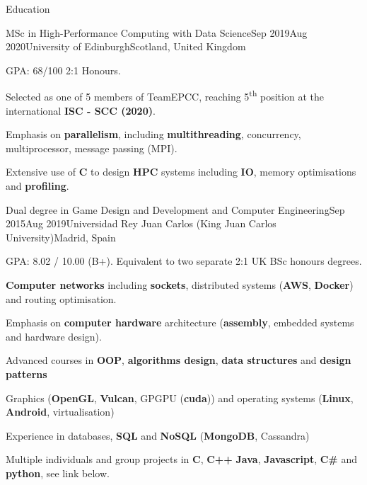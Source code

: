\documentclass{resume} %
\begin{document}
\begin{mainSection}{Education}
\begin{educationItem}
{MSc in High-Performance Computing with Data Science}{Sep 2019}{Aug 2020}{University of Edinburgh}{Scotland, United Kingdom}

\item GPA: 68/100 2:1 Honours.

\item Selected as one of 5 members of TeamEPCC, reaching 5\textsuperscript{th} position at the international \textbf{ISC - SCC (2020)}.%

\item Emphasis on \textbf{parallelism}, including \textbf{multithreading}, concurrency, multiprocessor, message passing (MPI).

\item Extensive use of \textbf{C} to design \textbf{HPC} systems including \textbf{IO}, memory optimisations and \textbf{profiling}.
\end{educationItem}
\begin{educationItem}
{Dual degree in Game Design and Development and Computer Engineering}{Sep 2015}{Aug 2019}{Universidad Rey Juan Carlos (King Juan Carlos University)}{Madrid, Spain}

\item GPA: 8.02 / 10.00 (B+). Equivalent to two separate 2:1 UK BSc honours degrees.

\item \textbf{Computer networks} including \textbf{sockets}, distributed systems (\textbf{AWS}, \textbf{Docker}) and routing optimisation.

\item Emphasis on \textbf{computer hardware} architecture (\textbf{assembly}, embedded systems and hardware design).

\item Advanced courses in \textbf{OOP}, \textbf{algorithms design}, \textbf{data structures} and \textbf{design patterns}

\item Graphics (\textbf{OpenGL}, \textbf{Vulcan}, GPGPU (\textbf{cuda})) and operating systems (\textbf{Linux}, \textbf{Android}, virtualisation)

\item Experience in databases, \textbf{SQL} and \textbf{NoSQL} (\textbf{MongoDB}, Cassandra)

\item Multiple individuals and group projects in \textbf{C}, \textbf{C++} \textbf{Java}, \textbf{Javascript}, \textbf{C\#} and \textbf{python}, see link below.
\end{educationItem}
\end{mainSection}
\end{document}
